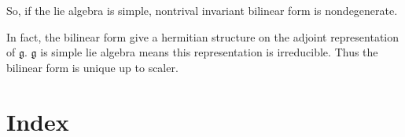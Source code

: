\documentclass[12pt]{amsart}
\def\fg{\mathfrak{g}}
\begin{document}
So, if the lie algebra is simple, nontrival invariant bilinear form
is nondegenerate. 

In fact, the bilinear form give a hermitian structure on the adjoint
representation of $\fg$. $\fg$ is simple lie algebra means this
representation is irreducible. Thus the bilinear form is unique up to scaler.

\section{Index}
\end{document}

